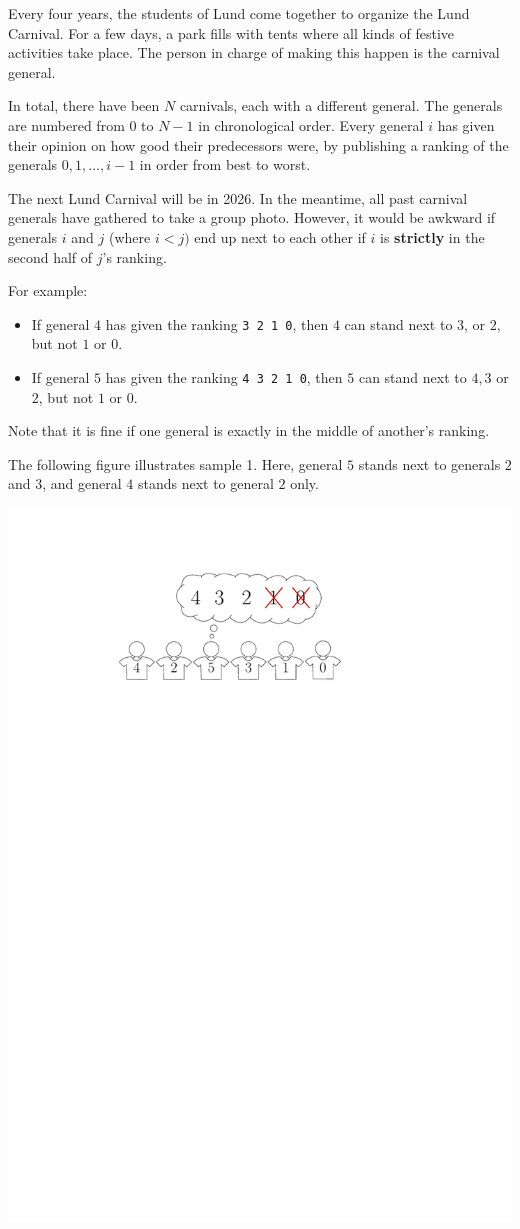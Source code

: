 Every four years, the students of Lund come together to organize the Lund Carnival. For a few days, 
a park fills with tents where all kinds of festive activities take place.
The person in charge of making this happen is the carnival general. 

In total, there have been $N$ carnivals, each with a different general. The generals are numbered
from $0$ to $N-1$ in chronological order. Every general $i$ has given their opinion on how good
their predecessors were, by publishing a ranking of the generals $0, 1, \ldots, i-1$
in order from best to worst.

The next Lund Carnival will be in 2026. In the meantime, all past carnival generals have 
gathered to take a group photo. However, it would be awkward if generals $i$ and $j$ (where $i < j)$
end up next to each other if $i$ is \textbf{strictly} in the second half of $j$'s ranking.

For example:

\begin{itemize}
  \item If general $4$ has given the ranking \verb|3 2 1 0|, then $4$ can stand next to $3$, or $2$, but not $1$ or $0$.
  \item If general $5$ has given the ranking \verb|4 3 2 1 0|, then $5$ can stand next to $4, 3$ or $2$, but not $1$ or $0$.
\end{itemize}

Note that it is fine if one general is exactly in the middle of another's ranking. 

The following figure illustrates sample 1. Here, general $5$ stands next to generals $2$ and $3$, 
and general $4$ stands next to general $2$ only.

\begin{center}
  \includegraphics[width=.8\textwidth]{sample}
\end{center}


